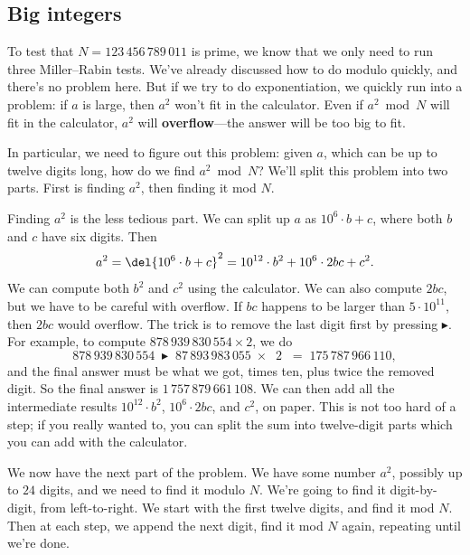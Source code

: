 \documentclass[11pt,paper=letter]{scrartcl}
\newcommand{\btn}[1]{\;\boxed{#1}\;}
\begin{document}
\subsection{Big integers}

To test that $N = 123\,456\,789\,011$ is prime, we know that we only need to run three Miller--Rabin tests. We've already discussed how to do modulo quickly, and there's no problem here. But if we try to do exponentiation, we quickly run into a problem: if $a$ is large, then $a^2$ won't fit in the calculator. Even if $a^2 \bmod N$ will fit in the calculator, $a^2$ will \textbf{overflow}---the answer will be too big to fit.

In particular, we need to figure out this problem: given $a$, which can be up to twelve digits long, how do we find $a^2 \bmod N$? We'll split this problem into two parts. First is finding $a^2$, then finding it mod $N$.

Finding $a^2$ is the less tedious part. We can split up $a$ as $10^6 \cdot b + c$, where both $b$ and $c$ have six digits. Then
$$ a^2 = \del{10^6 \cdot b + c}^2 = 10^{12} \cdot b^2 + 10^6 \cdot 2bc + c^2.$$
We can compute both $b^2$ and $c^2$ using the calculator. We can also compute $2bc$, but we have to be careful with overflow. If $bc$ happens to be larger than $5 \cdot 10^{11}$, then $2bc$ would overflow. The trick is to remove the last digit first by pressing $\blacktriangleright$. For example, to compute $878\,939\,830\,554 \times 2$, we do
$$878\,939\,830\,554 \btn{\blacktriangleright} 87\,893\,983\,055 \btn{\times} \btn{2} \btn{=} 175\,787\,966\,110,$$
and the final answer must be what we got, times ten, plus twice the removed digit. So the final answer is $1\,757\,879\,661\,108$. We can then add all the intermediate results $10^{12} \cdot b^2$, $10^6 \cdot 2bc$, and $c^2$, on paper. This is not too hard of a step; if you really wanted to, you can split the sum into twelve-digit parts which you can add with the calculator.

We now have the next part of the problem. We have some number $a^2$, possibly up to $24$ digits, and we need to find it modulo $N$. We're going to find it digit-by-digit, from left-to-right. We start with the first twelve digits, and find it mod $N$. Then at each step, we append the next digit, find it mod $N$ again, repeating until we're done.
\end{document}
